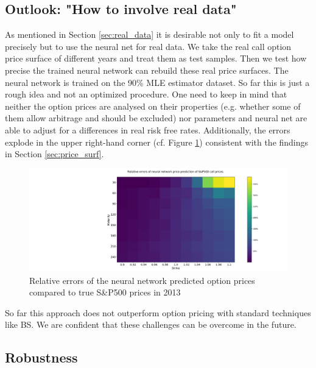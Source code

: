 \documentclass{article}
\begin{document}
\subsection{Outlook: "How to involve real data"}
\label{sec:results_sp500}
As mentioned in Section \ref{sec:real_data} it is desirable not only to fit a model precisely but to use the neural net for real data. We take the real call option price surface of different years and treat them as test samples. Then we test how precise the trained neural network can rebuild these real price surfaces. The neural network is trained on the 90\% MLE estimator dataset. So far this is just a rough idea and not an optimized procedure. One need to keep in mind that neither the option prices are analysed on their properties (e.g. whether some of them allow arbitrage and should be excluded) nor parameters and neural net are able to adjust for a differences in real risk free rates. Additionally, the errors explode in the upper right-hand corner (cf. Figure \ref{fig:MLE_Price_NN_rel_err}) consistent with the findings in Section \ref{sec:price_surf}.    
\begin{figure}[!ht]
\centering
\includegraphics[width=\textwidth]{MLE_Price_NN_err_Sp500.png}
\caption{Relative errors of the neural network predicted option prices compared to true S\&P500 prices in 2013}
\label{fig:MLE_Price_NN_rel_err}
\end{figure}
So far this approach does not outperform option pricing with standard techniques like BS. We are confident that these challenges can be overcome in the future.

\subsection{Robustness}
\end{document}
